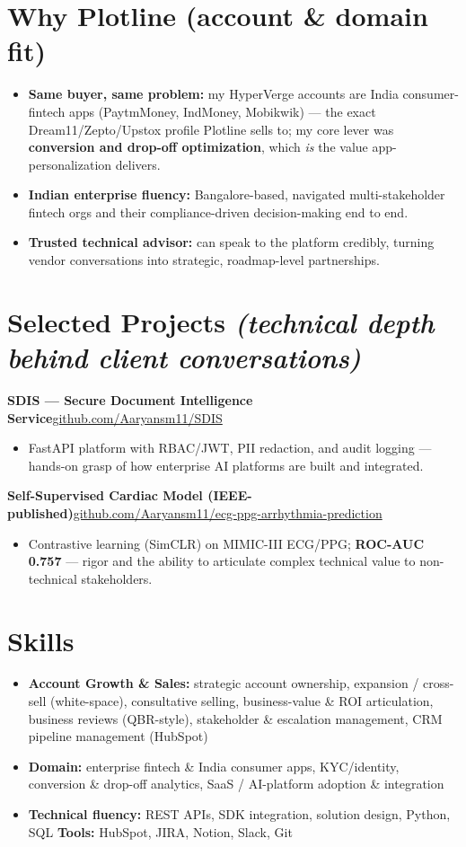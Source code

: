 \documentclass[10pt,a4paper]{article}
\begin{document}
\section*{Why Plotline (account \& domain fit)}
\begin{itemize}
\item \textbf{Same buyer, same problem:} my HyperVerge accounts are India consumer-fintech apps (PaytmMoney, IndMoney, Mobikwik) --- the exact Dream11/Zepto/Upstox profile Plotline sells to; my core lever was \textbf{conversion and drop-off optimization}, which \textit{is} the value app-personalization delivers.
\item \textbf{Indian enterprise fluency:} Bangalore-based, navigated multi-stakeholder fintech orgs and their compliance-driven decision-making end to end.
\item \textbf{Trusted technical advisor:} can speak to the platform credibly, turning vendor conversations into strategic, roadmap-level partnerships.
\end{itemize}
\section*{Selected Projects \textit{(technical depth behind client conversations)}}
\vspace{1pt}\textbf{SDIS --- Secure Document Intelligence Service}\hfill {\small\href{https://github.com/Aaryansm11/SDIS}{github.com/Aaryansm11/SDIS}}
\begin{itemize}
\item FastAPI platform with RBAC/JWT, PII redaction, and audit logging --- hands-on grasp of how enterprise AI platforms are built and integrated.
\end{itemize}
\vspace{1pt}\textbf{Self-Supervised Cardiac Model (IEEE-published)}\hfill {\small\href{https://github.com/Aaryansm11/ecg-ppg-arrhythmia-prediction}{github.com/Aaryansm11/ecg-ppg-arrhythmia-prediction}}
\begin{itemize}
\item Contrastive learning (SimCLR) on MIMIC-III ECG/PPG; \textbf{ROC-AUC 0.757} --- rigor and the ability to articulate complex technical value to non-technical stakeholders.
\end{itemize}
\section*{Skills}
\begin{itemize}
\item \textbf{Account Growth \& Sales:} strategic account ownership, expansion / cross-sell (white-space), consultative selling, business-value \& ROI articulation, business reviews (QBR-style), stakeholder \& escalation management, CRM pipeline management (HubSpot)
\item \textbf{Domain:} enterprise fintech \& India consumer apps, KYC/identity, conversion \& drop-off analytics, SaaS / AI-platform adoption \& integration
\item \textbf{Technical fluency:} REST APIs, SDK integration, solution design, Python, SQL  \textbar{}  \textbf{Tools:} HubSpot, JIRA, Notion, Slack, Git
\end{itemize}
\end{document}
